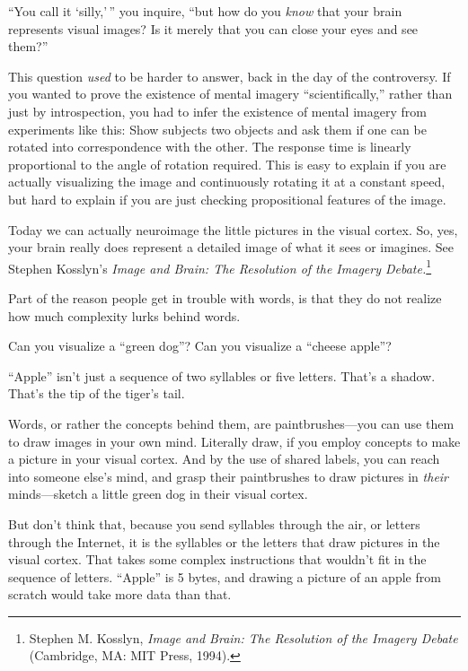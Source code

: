 {{{
 ``You call it
`silly,'\,'' you
inquire, ``but how do you \textit{know} that your
brain represents visual images? Is it merely that you can close your
eyes and see them?''}

{
 This question \textit{used} to be harder to answer, back in the
day of the controversy. If you wanted to prove the existence of mental
imagery ``scientifically,'' rather
than just by introspection, you had to infer the existence of mental
imagery from experiments like this: Show subjects two objects and ask
them if one can be rotated into correspondence with the other. The
response time is linearly proportional to the angle of rotation
required. This is easy to explain if you are actually visualizing the
image and continuously rotating it at a constant speed, but hard to
explain if you are just checking propositional features of the image.}

{
 Today we can actually neuroimage the little pictures in the visual
cortex. So, yes, your brain really does represent a detailed image of
what it sees or imagines. See Stephen Kosslyn's
\textit{Image and Brain: The Resolution of the Imagery
Debate.}\footnote{Stephen M. Kosslyn, \textit{Image and Brain: The Resolution of
the Imagery Debate} (Cambridge, MA: MIT Press, 1994).}}

{
 Part of the reason people get in trouble with words, is that they
do not realize how much complexity lurks behind words.}

{
 Can you visualize a ``green
dog''? Can you visualize a ``cheese
apple''?}

{
 ``Apple'' isn't
just a sequence of two syllables or five letters.
That's a shadow. That's the tip of the
tiger's tail.}

{
 Words, or rather the concepts behind them, are paintbrushes---you
can use them to draw images in your own mind. Literally draw, if you
employ concepts to make a picture in your visual cortex. And by the use
of shared labels, you can reach into someone else's
mind, and grasp their paintbrushes to draw pictures in \textit{their}
minds---sketch a little green dog in their visual cortex.}

{
 But don't think that, because you send syllables
through the air, or letters through the Internet, it is the syllables
or the letters that draw pictures in the visual cortex. That takes some
complex instructions that wouldn't fit in the sequence
of letters. ``Apple'' is 5 bytes,
and drawing a picture of an apple from scratch would take more data
than that.}

}}
